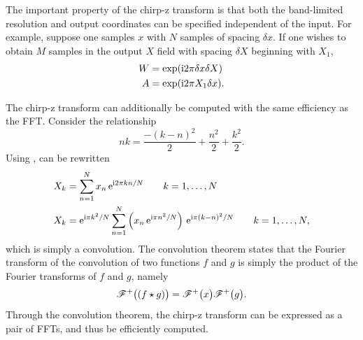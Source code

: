 The important property of the chirp-z transform is that both the
band-limited resolution and output coordinates can be specified independent of the input.
For example, suppose one samples $x$ with $N$ samples
of spacing $\delta x$.  If one wishes to obtain $M$ samples in the output
$X$ field with spacing $\delta X$ beginning with $X_1$,
\begin{align}
								W&=\exp({\mathrm{i}} 2 \pi \delta x \delta X)\\
								A&=\exp({\mathrm{i}} 2 \pi X_1 \delta x).
\end{align}

The chirp-z transform can additionally be computed with the same efficiency
as the FFT.  Consider the relationship
\begin{equation}
n k = \frac{-(k-n)^2}{2} + \frac{n^2}{2} + \frac{k^2}{2}.
\label{eqn:relationshipfargodingus}
\end{equation}
Using ,  can be rewritten
\begin{align}
								X_k &= \sum_{n=1}^{N} x_n\, {\mathrm{e}}^{{\mathrm{i}} 2\pi k n/N} \qquad k=1,\ldots,N\\
								X_k &= {\mathrm{e}}^{{\mathrm{i}} \pi k^2/N} \sum_{n=1}^{N} \left(x_n\, {\mathrm{e}}^{{\mathrm{i}} \pi n^2/N}\right)\,
								{\mathrm{e}}^{{\mathrm{i}} \pi(k-n)^2/N}\qquad k=1,\ldots,N,
\end{align}
which is simply a convolution.  The convolution theorem
states that the Fourier transform of the
convolution of two functions $f$ and $g$ is simply the product of the
Fourier transforms of $f$ and $g$, namely
\begin{equation}
{\mathscr{F}^{+}\bigl(\left(f \star g\right)\bigr)} = {\mathscr{F}^{+}\bigl(x\bigr)}{\mathscr{F}^{+}\bigl(g\bigr)}.
\end{equation}
Through the convolution theorem, the chirp-z transform can be expressed as
a pair of FFTs, and thus be efficiently computed.
